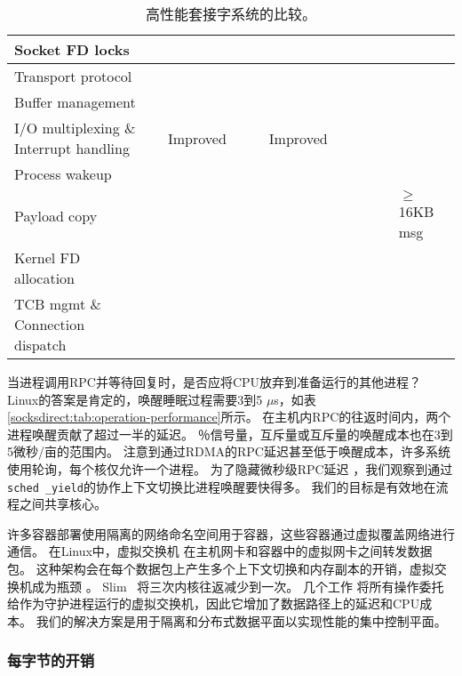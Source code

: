 \begin{sidewaystable*}[t]
{\begin{tabularx}{1.45\textwidth}{l|X|X|X|X|X|X|X|X|X|X|}
			\hline
			Socket FD locks & & & & & & & & & & \yes \\
			\hline
			Transport protocol & & & & & & & & \yes & \yes & \yes \\
			\hline
			Buffer management & & & & & & & & & & \yes \\
			\hline
			I/O multiplexing \& Interrupt handling & & Improved & \yes & \yes & Improved & \yes & \yes & \yes & \yes & \yes \\
			\hline
			Process wakeup & & & & & & & & & & \yes \\
			\hline
			Payload copy & & \yes & & & \yes & & & & & $\ge$16KB msg \\
			\hline
			Kernel FD allocation & & \yes &  &  & \yes & & & & & \yes \\
			\hline
			TCB mgmt \& Connection dispatch & \yes & \yes & \yes & \yes & \yes & & & & & \yes \\
			\hline
		\end{tabularx}
	}
	\caption{高性能套接字系统的比较。}
	\label{socksdirect:tab:related-work}
	
\end{sidewaystable*}




当进程调用RPC并等待回复时，是否应将CPU放弃到准备运行的其他进程？
Linux的答案是肯定的，唤醒睡眠过程需要3到5 $\mu$s，如表 \ref {socksdirect:tab:operation-performance}所示。
在主机内RPC的往返时间内，两个进程唤醒贡献了超过一半的延迟。
％信号量，互斥量或互斥量的唤醒成本也在3到5微秒/亩的范围内。
注意到通过RDMA的RPC延迟甚至低于唤醒成本，许多系统使用轮询，每个核仅允许一个进程。
为了隐藏微秒级RPC延迟 \cite {barroso2017attack}，我们观察到通过\texttt {sched \_yield}的协作上下文切换比进程唤醒要快得多。
我们的目标是有效地在流程之间共享核心。

许多容器部署使用隔离的网络命名空间用于容器，这些容器通过虚拟覆盖网络进行通信。
在Linux中，虚拟交换机 \cite {pfaff2015design}在主机网卡和容器中的虚拟网卡之间转发数据包。
这种架构会在每个数据包上产生多个上下文切换和内存副本的开销，虚拟交换机成为瓶颈 \cite {pfefferle2015hybrid}。
Slim~ \cite {slim}将三次内核往返减少到一次。
几个工作 \cite {martins2014clickos,roghanchi2017ffwd,huang2017high,nsdi19freeflow}将所有操作委托给作为守护进程运行的虚拟交换机，因此它增加了数据路径上的延迟和CPU成本。
我们的解决方案是用于隔离和分布式数据平面以实现性能的集中控制平面。


\subsubsection{每字节的开销}
\label{socksdirect:subsec:per-byte-overhead}
\quad

